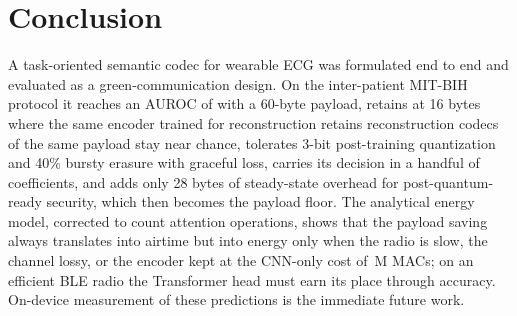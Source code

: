 \documentclass[journal]{IEEEtran}
\begin{document}
\section{Conclusion}
A task-oriented semantic codec for wearable ECG was formulated end to end and evaluated as a green-communication design. On the inter-patient MIT-BIH protocol it reaches an AUROC of \mainAUROC{} with a 60-byte payload, retains \taskNativeSixteen{} at 16 bytes where \ifhavepe the same encoder trained for reconstruction retains \sameencSixteen{}\else reconstruction codecs of the same payload stay near chance\fi, tolerates 3-bit post-training quantization and 40\% bursty erasure with graceful loss, carries its decision in a handful of coefficients, and adds only 28 bytes of steady-state overhead for post-quantum-ready security, which then becomes the payload floor. The analytical energy model, corrected to count attention operations, shows that the payload saving always translates into airtime but into energy only when the radio is slow, the channel lossy, or the encoder kept at the CNN-only cost of \cnnMACs{}\,M MACs; on an efficient BLE radio the Transformer head must earn its place through accuracy. On-device measurement of these predictions is the immediate future work.
\end{document}
